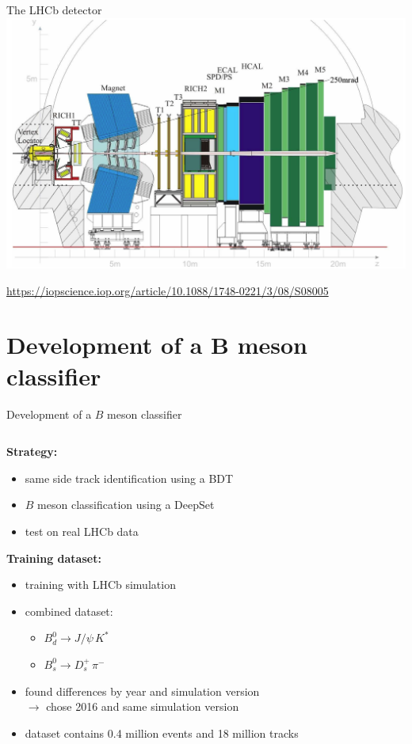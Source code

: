 \documentclass[aspectratio=1610, 10pt]{beamer}
\begin{document}
\begin{frame}{The LHCb detector}
  \centering
  \includegraphics[height=0.9\textheight]{images/lhcb_detector.png}

  \tiny \url{https://iopscience.iop.org/article/10.1088/1748-0221/3/08/S08005}
\end{frame}

\section*{Development of a B meson classifier}

\begin{frame}{Development of a $B$ meson classifier}
  \centering
  \begin{columns}
    \begin{column}{0.6\textwidth}
      \textbf{Strategy:}
      \begin{itemize}
        \item same side track identification using a BDT
        \item $B$ meson classification using a DeepSet
        \item test on real LHCb data
      \end{itemize}

      \pause
      \textbf{Training dataset:}
      \begin{itemize}
        \item training with LHCb simulation
        \item combined dataset:
        \begin{itemize}
          \item $B^0_d \rightarrow J/\psi \, K^*$
          \item $B^0_s \rightarrow D_s^+ \, \pi^-$
        \end{itemize}
        \item found differences by year and simulation version \\$\rightarrow$ chose 2016 and same simulation version
        \item dataset contains 0.4 million events and 18 million tracks
      \end{itemize}
    \end{column}
  \end{columns}
\end{frame}
\end{document}
